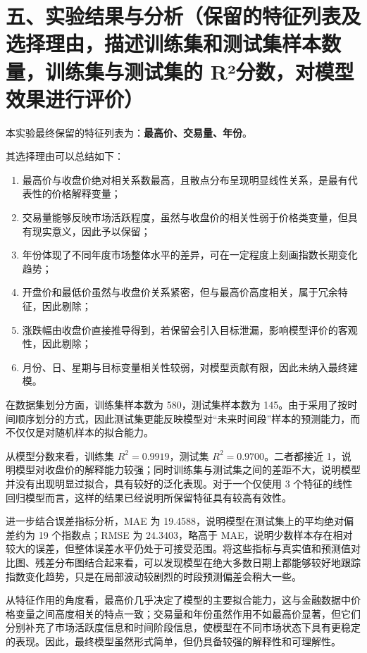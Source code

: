 \documentclass[12pt,a4paper]{ctexart}
\begin{document}
\section*{五、实验结果与分析（保留的特征列表及选择理由，描述训练集和测试集样本数量，训练集与测试集的 R²分数，对模型效果进行评价）}
本实验最终保留的特征列表为：\textbf{最高价、交易量、年份}。

其选择理由可以总结如下：
\begin{enumerate}[label=（\arabic*）]
\item 最高价与收盘价绝对相关系数最高，且散点分布呈现明显线性关系，是最有代表性的价格解释变量；
\item 交易量能够反映市场活跃程度，虽然与收盘价的相关性弱于价格类变量，但具有现实意义，因此予以保留；
\item 年份体现了不同年度市场整体水平的差异，可在一定程度上刻画指数长期变化趋势；
\item 开盘价和最低价虽然与收盘价关系紧密，但与最高价高度相关，属于冗余特征，因此剔除；
\item 涨跌幅由收盘价直接推导得到，若保留会引入目标泄漏，影响模型评价的客观性，因此剔除；
\item 月份、日、星期与目标变量相关性较弱，对模型贡献有限，因此未纳入最终建模。
\end{enumerate}

在数据集划分方面，训练集样本数为 580，测试集样本数为 145。由于采用了按时间顺序划分的方式，因此测试集更能反映模型对“未来时间段”样本的预测能力，而不仅仅是对随机样本的拟合能力。

从模型分数来看，训练集 $R^2=0.9919$，测试集 $R^2=0.9700$。二者都接近 1，说明模型对收盘价的解释能力较强；同时训练集与测试集之间的差距不大，说明模型并没有出现明显过拟合，具有较好的泛化表现。对于一个仅使用 3 个特征的线性回归模型而言，这样的结果已经说明所保留特征具有较高有效性。

进一步结合误差指标分析，MAE 为 19.4588，说明模型在测试集上的平均绝对偏差约为 19 个指数点；RMSE 为 24.3403，略高于 MAE，说明少数样本存在相对较大的误差，但整体误差水平仍处于可接受范围。将这些指标与真实值和预测值对比图、残差分布图结合起来看，可以发现模型在绝大多数日期上都能够较好地跟踪指数变化趋势，只是在局部波动较剧烈的时段预测偏差会稍大一些。

从特征作用的角度看，最高价几乎决定了模型的主要拟合能力，这与金融数据中价格变量之间高度相关的特点一致；交易量和年份虽然作用不如最高价显著，但它们分别补充了市场活跃度信息和时间阶段信息，使模型在不同市场状态下具有更稳定的表现。因此，最终模型虽然形式简单，但仍具备较强的解释性和可理解性。
\end{document}
